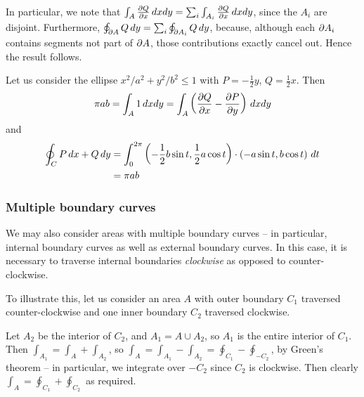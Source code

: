 \documentclass{../template/note}
\begin{document}
    \begin{remark*}
        In particular, we note that \(\int_A \pd Q x \D x dy = \sum_i \int_{A_i} \pd Q x \D x dy\), since the \(A_i\) are disjoint. Furthermore, \(\oint_{\partial A} Q \,d{y} = \sum_i \oint_{\partial A_i} Q \,d{y}\), because, although each \(\partial A_i\) contains segments not part of \(\partial A\), those contributions exactly cancel out. Hence the result follows.
    \end{remark*}
    
    
    \begin{example*}
        Let us consider the ellipse \(x^2/a^2 + y^2/b^2 \leq 1\) with \(P = -\frac 1 2 y\), \(Q = \frac 1 2 x\). Then
        \begin{align*}
            \pi ab = \int_A 1 \D x dy = \int_A \left(\pd Q x - \pd P y\right) \D x dy
        \end{align*}
        and
        \begin{align*}
            \oint_C P \,d{x} + Q \,d{y} &= \int_0^{2\pi} \left(-\frac 1 2 b \sin t, \frac 1 2 a \cos t\right) \cdot \left(-a \sin t, b \cos t\right) \,d{t} \\
            &= \pi ab
        \end{align*}
    \end{example*}
    
    \subsubsection{Multiple boundary curves}

    We may also consider areas with multiple boundary curves -- in particular, internal boundary curves as well as external boundary curves. In this case, it is necessary to traverse internal boundaries \emph{clockwise} as opposed to counter-clockwise.

    To illustrate this, let us consider an area \(A\) with outer boundary \(C_1\) traversed counter-clockwise and one inner boundary \(C_2\) traversed clockwise.

    Let \(A_2\) be the interior of \(C_2\), and \(A_1 = A \cup A_2\), so \(A_1\) is the entire interior of \(C_1\). Then \(\int_{A_1} = \int_A + \int_{A_2}\), so \(\int_A = \int_{A_1} - \int_{A_2} = \oint_{C_1} - \oint_{-C_2}\), by Green's theorem -- in particular, we integrate over \(-C_2\) since \(C_2\) is clockwise. Then clearly \(\int_A = \oint_{C_1} + \oint_{C_2}\) as required.
    
\end{document}
